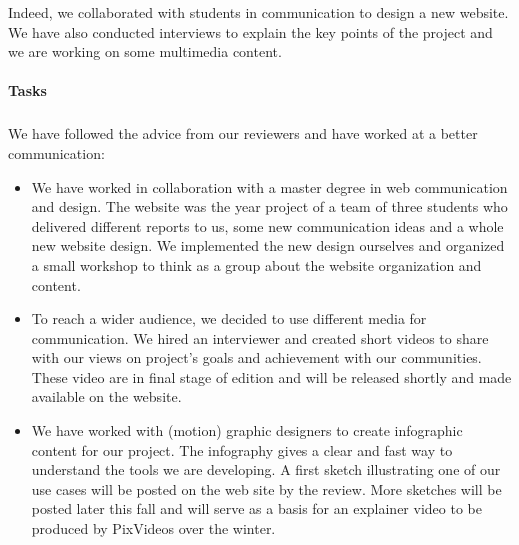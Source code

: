   Indeed, we collaborated with students in communication to design a new website. We have also conducted interviews to explain
  the key points of the project and we are working on some multimedia content.%


\paragraph{Tasks}

\subparagraph{}
\label{dissem@dissemination-communication}

We have followed the advice from our reviewers and have worked at a better communication:
\begin{itemize}
\item We have worked in collaboration with a master degree in web communication and design. The
\ODK website was the year project of a team of three students who delivered different reports to us, some
new communication ideas and a whole new website design. We implemented the new design ourselves and
organized a small workshop to think as a group about the website organization and content.
\item To reach a wider audience, we decided to use different media for communication. We hired an interviewer
and created short videos to share with our views on project's goals and achievement with our communities. These
video are in final stage of edition and will be released shortly and made available on the website.

\item We have worked with (motion) graphic designers to create
  infographic content for our project. The infography gives a clear
  and fast way to understand the tools we are developing. A first
  sketch illustrating one of our use cases will be posted on the web
  site by the review. More sketches will be posted later this fall and
  will serve as a basis for an explainer video to be produced by
  PixVideos over the winter.
\end{itemize}

